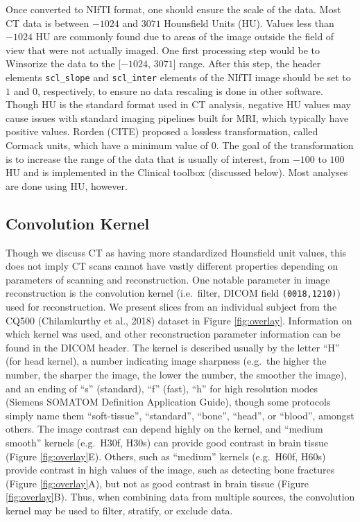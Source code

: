 \documentclass[utf8]{frontiersSCNS}
\begin{document}
Once converted to NIfTI format, one should ensure the scale of the data. Most CT data is between \(-1024\) and \(3071\) Hounsfield Units (HU). Values less than \(-1024\) HU are commonly found due to areas of the image outside the field of view that were not actually imaged. One first processing step would be to Winsorize the data to the {[}\(-1024\), \(3071\){]} range. After this step, the header elements \texttt{scl\_slope} and \texttt{scl\_inter} elements of the NIfTI image should be set to \(1\) and \(0\), respectively, to ensure no data rescaling is done in other software. Though HU is the standard format used in CT analysis, negative HU values may cause issues with standard imaging pipelines built for MRI, which typically have positive values. Rorden (CITE) proposed a lossless transformation, called Cormack units, which have a minimum value of \(0\). The goal of the transformation is to increase the range of the data that is usually of interest, from \(-100\) to \(100\)HU and is implemented in the Clinical toolbox (discussed below). Most analyses are done using HU, however.

\hypertarget{convolution-kernel}{%
\subsection{Convolution Kernel}\label{convolution-kernel}}

Though we discuss CT as having more standardized Hounsfield unit values, this does not imply CT scans cannot have vastly different properties depending on parameters of scanning and reconstruction. One notable parameter in image reconstruction is the convolution kernel (i.e.~filter, DICOM field \texttt{(0018,1210)}) used for reconstruction. We present slices from an individual subject from the CQ500 (Chilamkurthy et al., 2018) dataset in Figure \ref{fig:overlay}. Information on which kernel was used, and other reconstruction parameter information can be found in the DICOM header. The kernel is described usually by the letter ``H'' (for head kernel), a number indicating image sharpness (e.g.~the higher the number, the sharper the image, the lower the number, the smoother the image), and an ending of ``s'' (standard), ``f'' (fast), ``h'' for high resolution modes (Siemens SOMATOM Definition Application Guide),
though some protocols simply name them ``soft-tissue'', ``standard'', ``bone'', ``head'', or ``blood'', amongst others. The image contrast can depend highly on the kernel, and ``medium smooth'' kernels (e.g.~H30f, H30s) can provide good contrast in brain tissue (Figure \ref{fig:overlay}E). Others, such as ``medium'' kernels (e.g.~H60f, H60s) provide contrast in high values of the image, such as detecting bone fractures (Figure \ref{fig:overlay}A), but not as good contrast in brain tissue (Figure \ref{fig:overlay}B). Thus, when combining data from multiple sources, the convolution kernel may be used to filter, stratify, or exclude data.
\end{document}
